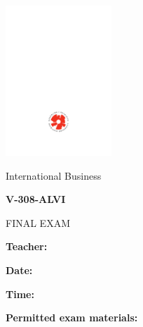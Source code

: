 \documentclass[a4paper,12pt,addpoints]{exam}
\begin{document}
\begin{titlepage}
  \sffamily
  \begin{center}
    \includegraphics[width=1.57in]{ru-logo}
    \par\vspace{40pt}
    \Huge International Business
    \par\medskip\Large\textbf{V-308-ALVI}
    \par\medskip\Large FINAL EXAM
  \end{center}
  \vfill
  \begin{flushleft}
    \textbf{Teacher:}
    \par\medskip\textbf{Date:}
    \par\medskip\textbf{Time:}
    \par\medskip\textbf{Permitted exam materials:}
  \end{flushleft}
  \vspace{33pt}
  \begin{flushleft}
    \par\vspace{5mm}
  \end{flushleft}
\end{titlepage}
\end{document}

